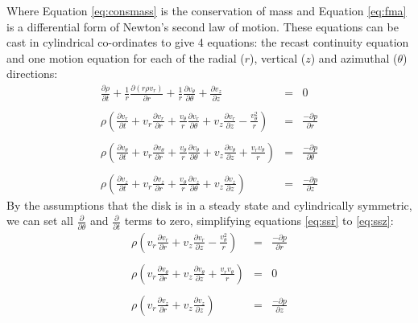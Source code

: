 Where Equation \ref{eq:consmass} is the conservation of mass and Equation \ref{eq:fma} is a differential form of Newton's second law of motion.  These equations can be cast in cylindrical co-ordinates to give 4 equations: the recast continuity equation and one motion equation for each of the radial ($r$), vertical ($z$) and azimuthal ($\theta$) directions:
\begin{eqnarray}
\frac{\partial\rho}{\partial t}+\frac{1}{r}\frac{\partial(r\rho v_r)}{\partial r}+\frac{1}{r}\frac{\partial v_\theta}{\partial\theta}+\frac{\partial v_z}{\partial z}&=&0\label{eq:ssc}\\\nonumber\\
\rho\left(\frac{\partial v_r}{\partial t}+v_r\frac{\partial v_r}{\partial r}+\frac{v_\theta}{r}\frac{\partial v_r}{\partial\theta}+v_z\frac{\partial v_r}{\partial z}-\frac{v_\theta^2}{r}\right)&=&\frac{-\partial p}{\partial r}\label{eq:ssr}\\\nonumber\\
\rho\left(\frac{\partial v_\theta}{\partial t}+v_r\frac{\partial v_\theta}{\partial r}+\frac{v_\theta}{r}\frac{\partial v_\theta}{\partial\theta}+v_z\frac{\partial v_\theta}{\partial z}+\frac{v_rv_\theta}{r}\right)&=&\frac{-\partial p}{\partial\theta}\\\nonumber\\
\rho\left(\frac{\partial v_z}{\partial t}+v_r\frac{\partial v_z}{\partial r}+\frac{v_\theta}{r}\frac{\partial v_z}{\partial\theta}+v_z\frac{\partial v_z}{\partial z}\right)&=&\frac{-\partial p}{\partial z}\label{eq:ssz}
\end{eqnarray}
By the assumptions that the disk is in a steady state and cylindrically symmetric, we can set all $\frac{\partial}{\partial\theta}$ and $\frac{\partial}{\partial t}$ terms to zero, simplifying equations \ref{eq:ssr} to \ref{eq:ssz}:
\begin{eqnarray}
\rho\left(v_r\frac{\partial v_r}{\partial r}+v_z\frac{\partial v_r}{\partial z}-\frac{v_\theta^2}{r}\right)&=&\frac{-\partial p}{\partial r}\label{eq:ssrs}\\\nonumber\\
\rho\left(v_r\frac{\partial v_\theta}{\partial r}+v_z\frac{\partial v_\theta}{\partial z}+\frac{v_rv_\theta}{r}\right)&=&0\label{eq:ssts}\\\nonumber\\
\rho\left(v_r\frac{\partial v_z}{\partial r}+v_z\frac{\partial v_z}{\partial z}\right)&=&\frac{-\partial p}{\partial z}\label{eq:sszs}
\end{eqnarray}
